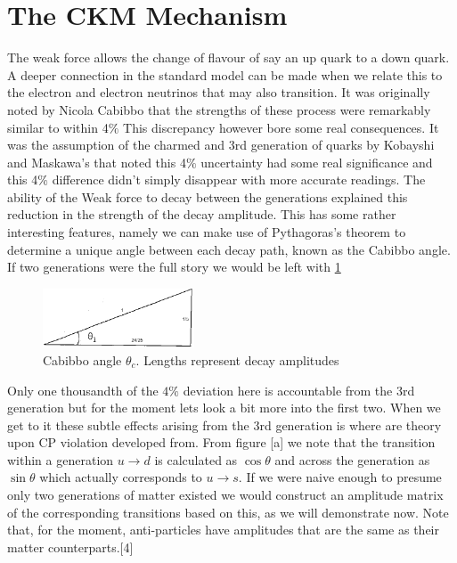 %
\section*{The CKM Mechanism}

The weak force allows the change of flavour of say an up quark to a down quark. A deeper connection in the standard model can be made when we relate this to the electron and electron neutrinos that may also transition. It was originally noted by Nicola Cabibbo that the strengths of these process were remarkably similar to within 4$\%$ This discrepancy however bore some real consequences. It was the assumption of the charmed and 3rd generation of quarks by Kobayshi and Maskawa’s that noted this 4$\%$ uncertainty had some real significance and this 4$\%$ difference didn't simply disappear with more accurate readings. The ability of the Weak force to decay between the generations explained this reduction in the strength of the decay amplitude. This has some rather interesting features, namely we can make use of Pythagoras's theorem to determine a unique angle between each decay path, known as the Cabibbo angle. If two generations were the full story we would be left with \cref{cabibbo}

\begin{figure}[h]
\centering
\includegraphics[width=0.4\textwidth]{figs/ckmfig1.jpg}
\caption{Cabibbo angle $\theta_c$. Lengths represent decay amplitudes}
\label{cabibbo}
\end{figure}


Only one thousandth of the $4\%$ deviation here is accountable from the 3rd generation but for the moment lets look a bit more into the first two.
When we get to it these subtle effects arising from the 3rd generation is where are theory upon CP violation developed from. From figure [a] we note that the transition within a generation $u\rightarrow d$ is calculated as $\cos\theta$ and across the generation as $\sin\theta$ which actually corresponds to $u\rightarrow s$. If we were naive enough to presume only two generations of matter existed we would construct an amplitude matrix of the corresponding transitions based on this, as we will demonstrate now. Note that, for the moment, anti-particles have amplitudes that are the same as their matter counterparts.[4]


